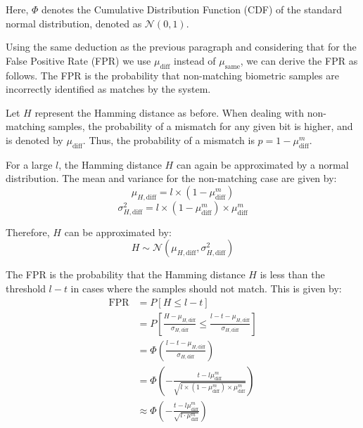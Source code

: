 Here, \(\Phi\) denotes the Cumulative Distribution Function (CDF) of the standard normal distribution, denoted as \(\mathcal{N}(0, 1)\).

Using the same deduction as the previous paragraph and considering that for the False Positive Rate (FPR) we use \(\mu_{\text{diff}}\) instead of \(\mu_{\text{same}}\), we can derive the FPR as follows. The FPR is the probability that non-matching biometric samples are incorrectly identified as matches by the system. 

Let \( H \) represent the Hamming distance as before. When dealing with non-matching samples, the probability of a mismatch for any given bit is higher, and is denoted by \( \mu_{\text{diff}} \). Thus, the probability of a mismatch is \( p = 1 - \mu_{\text{diff}}^m \).

For a large \( l \), the Hamming distance \( H \) can again be approximated by a normal distribution. The mean and variance for the non-matching case are given by:
\[
\mu_{H, \text{diff}} = l \times (1 - \mu_{\text{diff}}^m)
\]
\[
\sigma_{H, \text{diff}}^2 = l \times (1 - \mu_{\text{diff}}^m) \times \mu_{\text{diff}}^m
\]

Therefore, \( H \) can be approximated by:
\[
H \sim \mathcal{N}(\mu_{H, \text{diff}}, \sigma_{H, \text{diff}}^2)
\]

The FPR is the probability that the Hamming distance \( H \) is less than the threshold \( l - t \) in cases where the samples should not match. This is given by:
\begin{equation}
\begin{aligned}
    \label{eq:fpr}
    \text{FPR} &= P[H \leq l - t] \\
    &= P\left[\frac{H - \mu_{H, \text{diff}}}{\sigma_{H, \text{diff}}} \leq \frac{l - t - \mu_{H, \text{diff}}}{\sigma_{H, \text{diff}}}\right] \\
    &= \Phi\left(\frac{l - t - \mu_{H, \text{diff}}}{\sigma_{H, \text{diff}}}\right) \\
    &= \Phi\left(-\frac{t - l\mu_{\text{diff}}^m}{\sqrt{l \times (1 - \mu_{\text{diff}}^m) \times \mu_{\text{diff}}^m}}\right)\\
    &\approx\Phi\left(-\frac{t - l\mu_{\text{diff}}^m}{\sqrt{l\cdot \mu_{\text{diff}}^m}}\right)
\end{aligned}
\end{equation}



